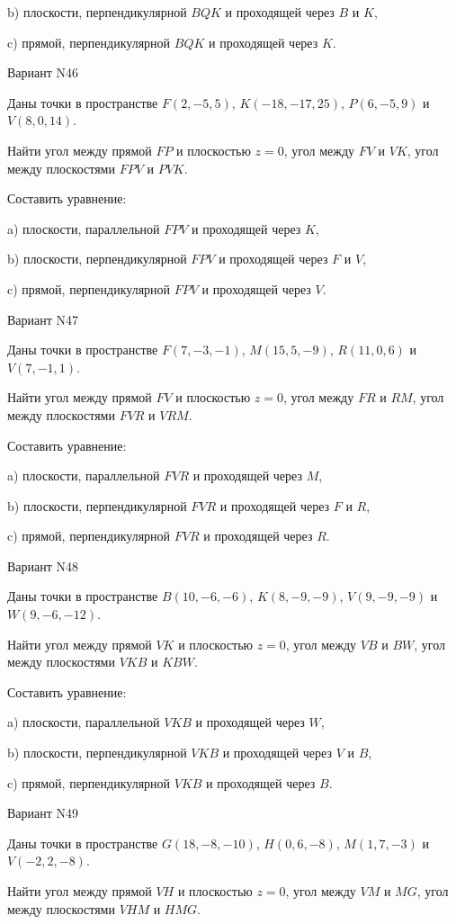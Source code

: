 \documentclass[11pt]{report}
\begin{document}
b) плоскости, перпендикулярной $BQK$ и проходящей через $B$ и $K$,

c) прямой, перпендикулярной $BQK$ и проходящей через $K$.

Вариант N46

Даны точки в пространстве
$F(2, -5, 5)$, $K(-18, -17, 25)$, $P(6, -5, 9)$ и
$V(8, 0, 14)$.

Найти угол между прямой $FP$ и плоскостью $z = 0$, угол между $FV$ и $VK$, угол между плоскостями $FPV$ 
и $PVK$.

Составить уравнение: 

a) плоскости, параллельной $FPV$ и проходящей через $K$,

b) плоскости, перпендикулярной $FPV$ и проходящей через $F$ и $V$,

c) прямой, перпендикулярной $FPV$ и проходящей через $V$.

Вариант N47

Даны точки в пространстве
$F(7, -3, -1)$, $M(15, 5, -9)$, $R(11, 0, 6)$ и
$V(7, -1, 1)$.

Найти угол между прямой $FV$ и плоскостью $z = 0$, угол между $FR$ и $RM$, угол между плоскостями $FVR$ 
и $VRM$.

Составить уравнение: 

a) плоскости, параллельной $FVR$ и проходящей через $M$,

b) плоскости, перпендикулярной $FVR$ и проходящей через $F$ и $R$,

c) прямой, перпендикулярной $FVR$ и проходящей через $R$.

Вариант N48

Даны точки в пространстве
$B(10, -6, -6)$, $K(8, -9, -9)$, $V(9, -9, -9)$ и
$W(9, -6, -12)$.

Найти угол между прямой $VK$ и плоскостью $z = 0$, угол между $VB$ и $BW$, угол между плоскостями $VKB$ 
и $KBW$.

Составить уравнение: 

a) плоскости, параллельной $VKB$ и проходящей через $W$,

b) плоскости, перпендикулярной $VKB$ и проходящей через $V$ и $B$,

c) прямой, перпендикулярной $VKB$ и проходящей через $B$.

Вариант N49

Даны точки в пространстве
$G(18, -8, -10)$, $H(0, 6, -8)$, $M(1, 7, -3)$ и
$V(-2, 2, -8)$.

Найти угол между прямой $VH$ и плоскостью $z = 0$, угол между $VM$ и $MG$, угол между плоскостями $VHM$ 
и $HMG$.
\end{document}
